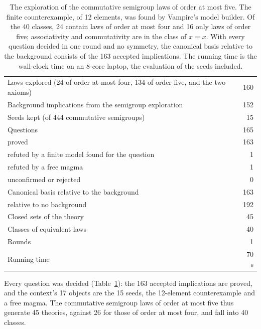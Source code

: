 \documentclass[11pt,a4paper]{article}
\theoremstyle{definition}
\theoremstyle{remark}
\begin{document}
\begin{table}[!htbp]
\centering
\small
\begin{tabularx}{\textwidth}{@{}Xr@{}}
\toprule
Laws explored (24 of order at most four, 134 of order five, and the two axioms) & 160 \\
Background implications from the semigroup exploration & 152 \\
Seeds kept (of 444 commutative semigroups) & 15 \\
Questions & 165 \\
\quad proved & 163 \\
\quad refuted by a finite model found for the question & 1 \\
\quad refuted by a free magma & 1 \\
\quad unconfirmed or rejected & 0 \\
Canonical basis relative to the background & 163 \\
\quad relative to no background & 192 \\
Closed sets of the theory & 45 \\
Classes of equivalent laws & 40 \\
Rounds & 1 \\
Running time & 70 s \\
\bottomrule
\end{tabularx}
\caption{The exploration of the commutative semigroup laws of order at most five. The finite counterexample, of 12 elements, was found by Vampire's model builder. Of the 40 classes, 24 contain laws of order at most four and 16 only laws of order five; associativity and commutativity are in the class of $x = x$. With every question decided in one round and no symmetry, the canonical basis relative to the background consists of the 163 accepted implications. The running time is the wall-clock time on an 8-core laptop, the evaluation of the seeds included.}\label{tab:csemigroups}
\end{table}

Every question was decided (Table~\ref{tab:csemigroups}): the 163 accepted implications are proved, and the context's 17 objects are the 15 seeds, the 12-element counterexample and a free magma. The commutative semigroup laws of order at most five thus generate 45 theories, against 26 for those of order at most four, and fall into 40 classes.
\end{document}
